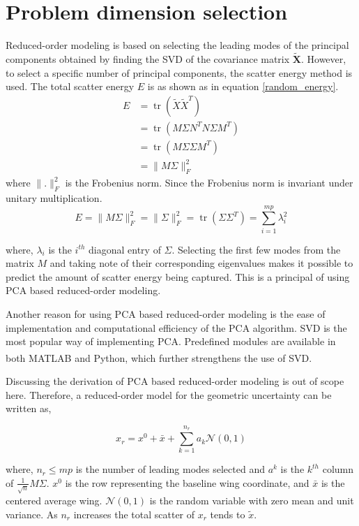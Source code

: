 \section{Problem dimension selection}

Reduced-order modeling is based on selecting the leading modes of the principal components obtained by finding the SVD of the covariance matrix $\tilde{\textbf{X}}$. However, to select a specific number of principal components, the scatter energy method is used. The total scatter energy $E$ is as shown as in equation \ref{random_energy}.
\begin{equation}\begin{aligned}
E &=\operatorname{tr}\left(\tilde{X} \tilde{X}^{T}\right) \\
&=\operatorname{tr}\left(M \Sigma N^{T} N \Sigma M^{T}\right) \\
&=\operatorname{tr}\left(M \Sigma \Sigma M^{T}\right) \\
&=\|M \Sigma\|_{F}^{2}
\end{aligned}
\label{random_energy}
\end{equation}
where $\|.\|_{F}^{2}$ is the Frobenius norm. Since the Frobenius norm is invariant under unitary multiplication.
$$E=\|M \Sigma\|_{F}^{2}=\|\Sigma\|_{F}^{2}=\operatorname{tr}\left(\Sigma \Sigma^{T}\right)=\sum_{i=1}^{m p} \lambda_{i}^{2}$$

where, $\lambda_i$ is the $i^{th}$ diagonal entry of $\Sigma$. Selecting the first few modes from the matrix $M$ and taking note of their corresponding eigenvalues makes it possible to predict the amount of scatter energy being captured. This is a principal of using PCA based reduced-order modeling.

Another reason for using PCA based reduced-order modeling is the ease of implementation and computational efficiency of the PCA algorithm. SVD is the most popular way of implementing PCA. Predefined modules are available in both MATLAB\textsuperscript{\textregistered} and Python, which further strengthens the use of SVD.

Discussing the derivation of PCA based reduced-order modeling is out of scope here. Therefore, a reduced-order model for the geometric uncertainty can be written as,

\begin{equation}
x_{r}=x^{0}+\bar{x}+\sum_{k=1}^{n_{r}} a_{k} \mathcal{N}(0,1)
\label{reduced-order}
\end{equation}

where, $n_r \leq mp$ is the number of leading modes selected and $a^k$ is the $k^{th}$ column of $\frac{1}{\sqrt{n}}M\Sigma$. $x^0$ is the row representing the baseline wing coordinate, and $\bar{x}$ is the centered average wing. $\mathcal{N}(0,1)$ is the random variable with zero mean and unit variance. As $n_r$ increases the total scatter of $x_r$ tends to $\tilde{x}$. 

